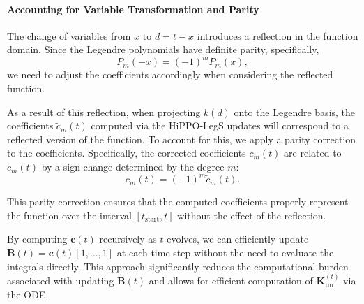 \paragraph{Accounting for Variable Transformation and Parity}

The change of variables from \( x \) to \( d = t - x \) introduces a reflection in the function domain. Since the Legendre polynomials have definite parity, specifically,
\begin{equation}
    P_m(-x) = (-1)^m P_m(x),
\end{equation}
we need to adjust the coefficients accordingly when considering the reflected function.

As a result of this reflection, when projecting \( k(d) \) onto the Legendre basis, the coefficients \( \tilde{c}_m(t) \) computed via the HiPPO-LegS updates will correspond to a reflected version of the function. To account for this, we apply a parity correction to the coefficients. Specifically, the corrected coefficients \( c_m(t) \) are related to \( \tilde{c}_m(t) \) by a sign change determined by the degree \( m \):
\begin{equation}
    c_m(t) = (-1)^m \tilde{c}_m(t).
\end{equation}

This parity correction ensures that the computed coefficients properly represent the function over the interval \( [t_{\text{start}}, t] \) without the effect of the reflection.


By computing \( \mathbf{c}(t) \) recursively as \( t \) evolves, we can efficiently update \( \tilde{\mathbf{B}}(t) = \mathbf{c}(t) [1, \dots, 1] \) at each time step without the need to evaluate the integrals directly. This approach significantly reduces the computational burden associated with updating \( \tilde{\mathbf{B}}(t) \) and allows for efficient computation of \( \mathbf{K}_\mathbf{uu}^{(t)} \) via the ODE.

